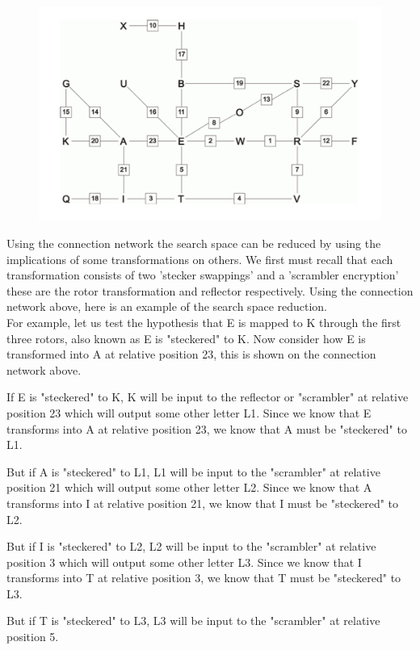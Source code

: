 \documentclass[12pt,a4paper]{article}
\begin{document}
\begin{figure}[h]
\centering
\includegraphics[width=\textwidth]{StageTwoBOMBE.png}
\end{figure}

Using the connection network the search space can be reduced by using the implications of some transformations on others. We first must recall that each transformation consists of two 'stecker swappings' and a 'scrambler encryption' these are the rotor transformation and reflector respectively. Using the connection network above, here is an example of the search space reduction.\\

For example, let us test the hypothesis that E is mapped to K through the first three rotors, also known as E is "steckered" to K. Now consider how E is transformed into A at relative position 23, this is shown on the connection network above.

If E is "steckered" to K, K will be input to the reflector or "scrambler" at relative position 23 which will output some other letter L1. Since we know that E transforms into A at relative position 23, we know that A must be "steckered" to L1.

But if A is "steckered" to L1, L1 will be input to the "scrambler" at relative position 21 which will output some other letter L2. Since we know that A transforms into I at relative position 21, we know that I must be "steckered" to L2.

But if I is "steckered" to L2, L2 will be input to the "scrambler" at relative position 3 which will output some other letter L3. Since we know that I transforms into T at relative position 3, we know that T must be "steckered" to L3.

But if T is "steckered" to L3, L3 will be input to the "scrambler" at relative position 5.
\end{document}
